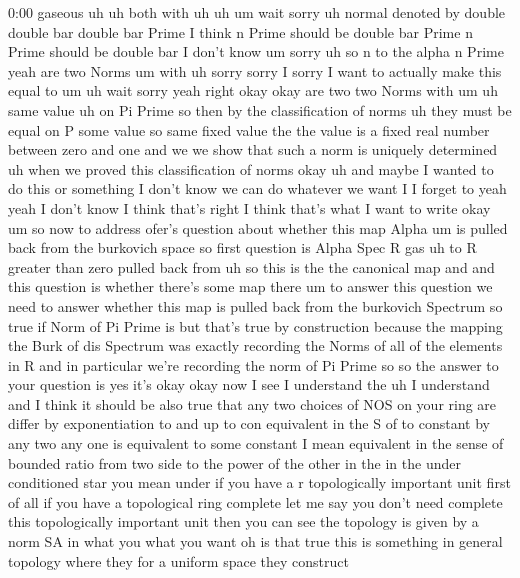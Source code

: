\begin{unfinished}{0:00}
gaseous  uh  uh  both  with
uh
uh  um  wait  sorry  uh  normal  denoted  by
double  double  bar  double  bar  Prime  I
think  n  Prime  should  be  double  bar  Prime
n  Prime  should  be  double
bar  I  don't  know
um  sorry  uh  so  n  to  the  alpha  n  Prime
yeah  are  two  Norms
um  with  uh  sorry  sorry  I  sorry  I  want  to
actually  make  this  equal  to  um  uh  wait
sorry
yeah  right  okay  okay  are  two  two  Norms
with
um  uh  same
value  uh  on  Pi  Prime  so  then  by  the
classification  of
norms  uh  they  must  be
equal  on  P  some  value  so  same  fixed
value  the  the  value  is  a  fixed  real
number  between  zero  and  one  and  we  we
show  that  such  a  norm  is  uniquely
determined  uh  when  we  proved  this
classification  of
norms  okay  uh  and  maybe  I  wanted  to  do
this  or  something  I  don't  know  we  can  do
whatever  we
want  I  I  forget  to
yeah  yeah  I  don't  know  I  think  that's
right  I  think  that's  what  I  want  to
write  okay  um  so  now  to  address  ofer's
question  about  whether  this  map  Alpha  um
is  pulled  back  from  the  burkovich  space
so  first
question  is
Alpha  Spec  R  gas  uh  to  R  greater  than
zero  pulled
back
from
uh  so  this  is  the  the  canonical  map  and
and  this  question  is  whether  there's
some  map  there  um  to  answer  this
question  we  need  to  answer  whether  this
map  is  pulled  back  from  the  burkovich
Spectrum  so  true  if  Norm  of  Pi  Prime  is
but  that's  true  by
construction  because  the  mapping  the
Burk  of  dis  Spectrum  was  exactly
recording  the  Norms  of  all  of  the
elements  in  R  and  in  particular  we're
recording  the  norm  of  Pi  Prime  so  so  the
answer  to  your  question  is
yes  it's  okay  okay  now  I  see  I
understand
the
uh  I
understand  and  I  think  it  should  be  also
true  that  any  two  choices  of  NOS  on  your
ring  are  differ  by  exponentiation  to  and
up  to  con  equivalent  in  the  S  of  to
constant  by  any  two  any  one  is
equivalent  to
some  constant  I  mean  equivalent  in  the
sense  of  bounded  ratio  from  two  side  to
the  power  of  the  other  in  the  in  the
under  conditioned  star  you  mean  under  if
you  have  a  r  topologically  important
unit  first  of  all  if  you  have  a
topological  ring  complete  let  me  say  you
don't  need  complete  this  topologically
important  unit  then  you  can  see  the
topology  is  given  by  a  norm  SA  in  what
you  what  you  want  oh  is  that  true  this
is  something  in  general  topology  where
they  for  a  uniform  space  they  construct

\end{unfinished}
